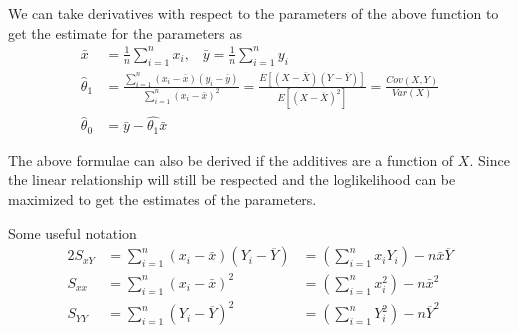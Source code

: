 \documentclass[../probability-notes.tex]{subfiles}
\begin{document}
    We can take derivatives with respect to the parameters of the above function to get the estimate for the parameters as
    \begin{align*}
        \bar{x} &= \frac{1}{n} \sum_{i=1}^{n} x_{i} \text{,}\quad \bar{y} = \frac{1}{n} \sum_{i=1}^{n} y_{i}\\
        \hat{\theta}_{1} &= \frac{\sum_{i=1}^{n} (x_{i} - \bar{x}) (y_{i} - \bar{y})}{\sum_{i=1}^{n}(x_{i} - \bar{x})^{2}} = \frac{E[(X-\overline{X})(Y-\overline{Y})]}{E[(X-\overline{X})^{2}]} = \frac{Cov(X,Y)}{Var(X)}\\
        \hat{\theta}_{0} &= \bar{y} - \hat{\theta_{1}} \bar{x}
    \end{align*}

    The above formulae can also be derived if the additives are a function of $X$. Since the linear relationship will still be respected and the loglikelihood can be maximized to get the estimates of the parameters.\newline

    Some useful notation
    \begin{alignat*}{2}
        S_{xY} &= \sum_{i=1}^{n} (x_{i} - \bar{x})(Y_{i} - \overline{Y}) &= (\sum_{i=1}^{n}x_{i}Y_{i}) - n\bar{x}\overline{Y}\\
        S_{xx} &= \sum_{i=1}^{n} (x_{i} - \bar{x})^{2} &= (\sum_{i=1}^{n} x_{i}^{2}) - n\bar{x}^{2}\\
        S_{YY} &= \sum_{i=1}^{n} (Y_{i} - \overline{Y})^{2} &= (\sum_{i=1}^{n} Y_{i}^{2}) - n\overline{Y}^{2}
    \end{alignat*}

\end{document}
